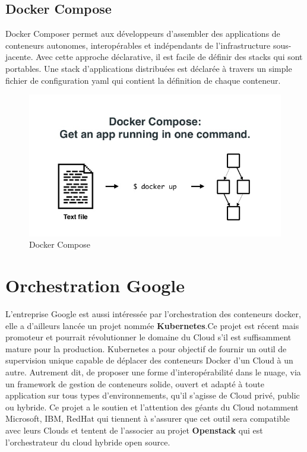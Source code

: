 \begin{onehalfspace}
\subsection*{Docker Compose}
  Docker Composer permet aux développeurs d'assembler des applications de conteneurs autonomes, interopérables et indépendants de l'infrastructure sous-jacente. Avec cette approche déclarative, il est facile de définir des stacks qui sont portables. Une stack d'applications distribuées est déclarée à travers un simple fichier de configuration \acrshort{yaml} qui contient la définition de chaque conteneur.
\begin{figure}[H]
\centering
\includegraphics [scale=0.5]{chapitre3/assets/dockercompose.jpg}
\caption{Docker Compose}
\end{figure}
\section{Orchestration Google}
L'entreprise Google est aussi intéressée par l'orchestration des conteneurs docker, elle a d'ailleurs lancée un projet nommée \textbf{Kubernetes}.Ce projet est récent mais promoteur et pourrait révolutionner le domaine du Cloud s'il est suffisamment mature pour la production. Kubernetes a pour objectif de fournir un outil de supervision unique capable de déplacer des conteneurs Docker d'un Cloud à un autre. Autrement dit, de proposer une forme d’interopérabilité dans le nuage, via un framework de gestion de conteneurs solide, ouvert et adapté à toute application sur tous types d’environnements, qu’il s’agisse de Cloud privé, public ou hybride. Ce projet a le soutien et l'attention des géants du Cloud notamment Microsoft, IBM, RedHat qui tiennent à s'assurer que cet outil sera compatible avec leurs Clouds et tentent de l'associer au projet \textbf{Openstack} qui est l'orchestrateur du cloud hybride open source.

\end{onehalfspace}
